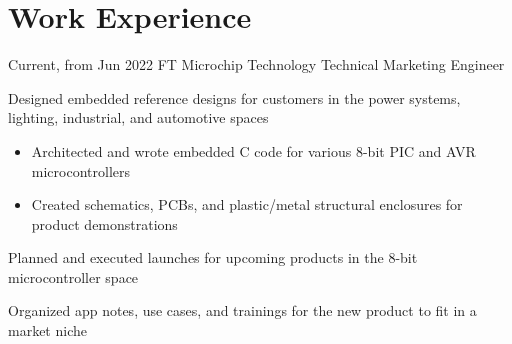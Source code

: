 \documentclass[
	10pt, %
]{FreemanCV}
\begin{document}
\vspace{-35pt}

\section{Work Experience}





\jobentry
	{Current, from Jun 2022} %
	{FT} %
	{Microchip Technology} %
	{Technical Marketing Engineer} %
	{ %
		\item Designed embedded reference designs for customers in the power systems, lighting, industrial, and automotive spaces
		\begin{itemize}[topsep=-10pt]
			\itemsep-5pt
			\item Architected and wrote embedded C code for various 8-bit PIC and AVR microcontrollers 
			\item Created schematics, PCBs, and plastic/metal structural enclosures for product demonstrations
		\end{itemize}
		\item Planned and executed launches for upcoming products in the 8-bit microcontroller space
		\item Organized app notes, use cases, and trainings for the new product to fit in a market niche

	} 
\end{document}

